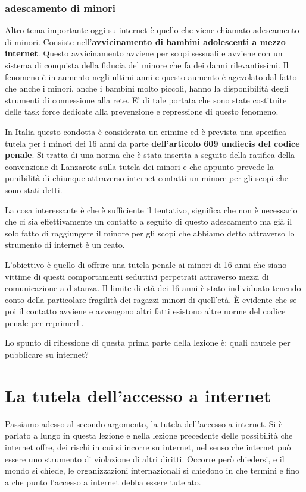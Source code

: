 \subsubsection{adescamento di minori}

Altro tema importante oggi su internet è quello che viene chiamato adescamento di minori. Consiste nell'\textbf{avvicinamento di bambini adolescenti a mezzo internet}. Questo avvicinamento avviene per scopi sessuali e avviene con un sistema di conquista della fiducia del minore che fa dei danni rilevantissimi. Il fenomeno è in aumento negli ultimi anni e questo aumento è agevolato dal fatto che anche i minori, anche i bambini molto piccoli, hanno la disponibilità degli strumenti di connessione alla rete. E' di tale portata che sono state costituite delle task force dedicate alla prevenzione e repressione di questo fenomeno.

In Italia questo condotta è considerata un crimine ed è prevista una specifica tutela per i minori dei 16 anni da parte \textbf{ dell'articolo 609 undiecis del codice penale}. Si tratta di una norma che è stata inserita a seguito della ratifica della convenzione di Lanzarote sulla tutela dei minori e che appunto prevede la punibilità di chiunque attraverso internet contatti un minore per gli scopi che sono stati detti.

La cosa interessante è che è sufficiente il tentativo, significa che non è necessario che ci sia effettivamente un contatto a seguito di questo adescamento ma già il solo fatto di raggiungere il minore per gli scopi che abbiamo detto attraverso lo strumento di internet è un reato.

L'obiettivo è quello di offrire una tutela penale ai minori di 16 anni che siano vittime di questi comportamenti seduttivi perpetrati attraverso mezzi di comunicazione a distanza. Il limite di età dei 16 anni è stato individuato tenendo conto della particolare fragilità dei ragazzi minori di quell'età. È evidente che se poi il contatto avviene e avvengono altri fatti esistono altre norme del codice penale per reprimerli.

Lo spunto di riflessione di questa prima parte della lezione è: quali cautele per pubblicare su internet?

\section{La tutela dell'accesso a internet}

Passiamo adesso al secondo argomento, la tutela dell'accesso a internet. Si è parlato a lungo in questa lezione e nella lezione precedente delle possibilità che internet offre, dei rischi in cui si incorre su internet, nel senso che internet può essere uno strumento di violazione di altri diritti. Occorre però chiedersi, e il mondo si chiede, le organizzazioni internazionali si chiedono in che termini e fino a che punto l'accesso a internet debba essere tutelato.


